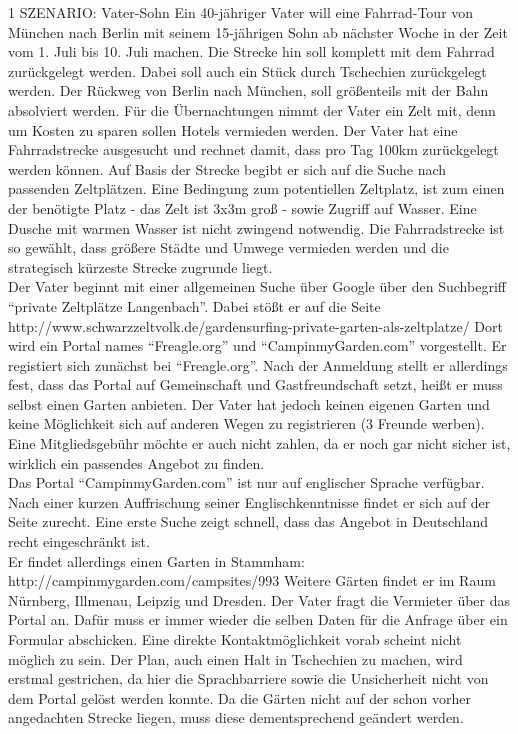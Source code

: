 1 SZENARIO: Vater-Sohn
Ein 40-jähriger Vater will eine Fahrrad-Tour von München nach Berlin mit seinem 15-jährigen Sohn ab nächster Woche in der Zeit vom 1. Juli bis 10. Juli machen. Die Strecke hin soll komplett mit dem Fahrrad zurückgelegt werden. Dabei soll auch ein Stück durch Tschechien zurückgelegt werden. Der Rückweg von Berlin nach München, soll größenteils mit der Bahn absolviert werden. Für die Übernachtungen nimmt der Vater ein Zelt mit, denn um Kosten zu sparen sollen Hotels vermieden werden.
Der Vater hat eine Fahrradstrecke ausgesucht und rechnet damit, dass pro Tag 100km zurückgelegt werden können. Auf Basis der Strecke begibt er sich auf die Suche nach passenden Zeltplätzen. Eine Bedingung zum potentiellen Zeltplatz, ist zum einen der benötigte Platz - das Zelt ist 3x3m groß - sowie Zugriff auf Wasser. Eine Dusche mit warmen Wasser ist nicht zwingend notwendig.
Die Fahrradstrecke ist so gewählt, dass größere Städte und Umwege vermieden werden und die strategisch kürzeste Strecke zugrunde liegt.\\
Der Vater beginnt mit einer allgemeinen Suche über Google über den Suchbegriff “private Zeltplätze Langenbach”. Dabei stößt er auf die Seite\\ http://www.schwarzzeltvolk.de/gardensurfing-private-garten-als-zeltplatze/
Dort wird ein Portal names “Freagle.org” und “CampinmyGarden.com” vorgestellt. Er registiert sich zunächst bei “Freagle.org”. Nach der Anmeldung stellt er allerdings fest, dass das Portal auf Gemeinschaft und Gastfreundschaft setzt, heißt er muss selbst einen Garten anbieten. Der Vater hat jedoch keinen eigenen Garten und keine Möglichkeit sich auf anderen Wegen zu registrieren (3 Freunde werben). Eine Mitgliedsgebühr möchte er auch nicht zahlen, da er noch gar nicht sicher ist, wirklich ein passendes Angebot zu finden.\\
Das Portal “CampinmyGarden.com” ist nur auf englischer Sprache verfügbar. Nach einer kurzen Auffrischung seiner Englischkenntnisse findet er sich auf der Seite zurecht. Eine erste Suche zeigt schnell, dass das Angebot in Deutschland recht eingeschränkt ist.\\
Er findet allerdings einen Garten in Stammham: http://campinmygarden.com/campsites/993
Weitere Gärten findet er im Raum Nürnberg, Illmenau, Leipzig und Dresden. Der Vater fragt die Vermieter über das Portal an. Dafür muss er immer wieder die selben Daten für die Anfrage über ein Formular abschicken. Eine direkte Kontaktmöglichkeit vorab scheint nicht möglich zu sein.
Der Plan, auch einen Halt in Tschechien zu machen, wird erstmal gestrichen, da hier die Sprachbarriere sowie die Unsicherheit nicht von dem Portal gelöst werden konnte.
Da die Gärten nicht auf der schon vorher angedachten Strecke liegen, muss diese dementsprechend geändert werden.\\

